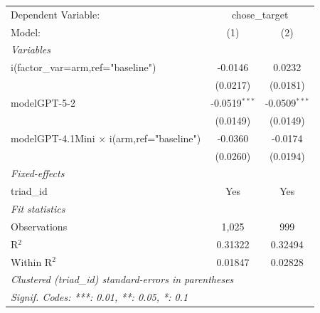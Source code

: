 
\begingroup
\centering
\begin{tabular}{lcc}
   \tabularnewline \midrule \midrule
   Dependent Variable: & \multicolumn{2}{c}{chose\_target}\\
   Model:                                           & (1)             & (2)\\  
   \midrule
   \emph{Variables}\\
   i(factor\_var=arm,ref="baseline")                & -0.0146         & 0.0232\\   
                                                    & (0.0217)        & (0.0181)\\   
   modelGPT-5-2                                     & -0.0519$^{***}$ & -0.0509$^{***}$\\   
                                                    & (0.0149)        & (0.0149)\\   
   modelGPT-4.1Mini $\times$ i(arm,ref="baseline")  & -0.0360         & -0.0174\\   
                                                    & (0.0260)        & (0.0194)\\   
   \midrule
   \emph{Fixed-effects}\\
   triad\_id                                        & Yes             & Yes\\  
   \midrule
   \emph{Fit statistics}\\
   Observations                                     & 1,025           & 999\\  
   R$^2$                                            & 0.31322         & 0.32494\\  
   Within R$^2$                                     & 0.01847         & 0.02828\\  
   \midrule \midrule
   \multicolumn{3}{l}{\emph{Clustered (triad\_id) standard-errors in parentheses}}\\
   \multicolumn{3}{l}{\emph{Signif. Codes: ***: 0.01, **: 0.05, *: 0.1}}\\
\end{tabular}
\par\endgroup


